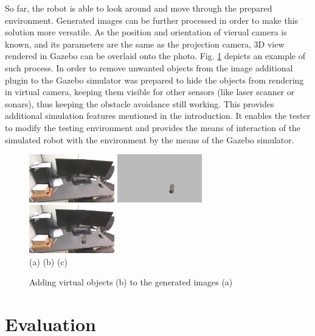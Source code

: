 \documentclass{svproc}
\begin{document}
So far, the robot is able to look around and move through the prepared environment. 
Generated images can be further processed in order to make this solution more versatile.
As the position and orientation of vierual camera is known, and its parameters are the same
as the projection camera, 3D view rendered in Gazebo can be overlaid onto the photo.
Fig. \ref{fig:join} depicts an example of such process.
In order to remove unwanted objects from the image additional plugin to the Gazebo simulator
was prepared to hide the objects from rendering in virtual camera, keeping them 
visible for other sensors (like laser scanner or sonars), thus keeping the obstacle avoidance
still working. This provides additional simulation features mentioned in the introduction. 
It enables the tester to modify the testing environment and provides the means of interaction 
of the simulated robot with the environment by the means of the Gazebo simulator.

\begin{figure}[!ht]
    \centering
        \includegraphics[width=0.33\textwidth,trim=29cm 0 0 5cm,clip]{img/gazebo_integration/sim.jpg}\hfill%
        \includegraphics[width=0.33\textwidth,trim=29cm 0 0 5cm,clip]{img/gazebo_integration/gazebo.jpg}\hfill%
        \includegraphics[width=0.33\textwidth,trim=29cm 0 0 5cm,clip]{img/gazebo_integration/sum.jpg}\\
        \hfill (a) \hfill\hfill (b) \hfill\hfill (c) \hfill~
    \caption{Adding virtual objects (b) to the generated images (a)}
    \label{fig:join}
\end{figure}


\section{Evaluation}
\label{sec:evaluation}
\end{document}
